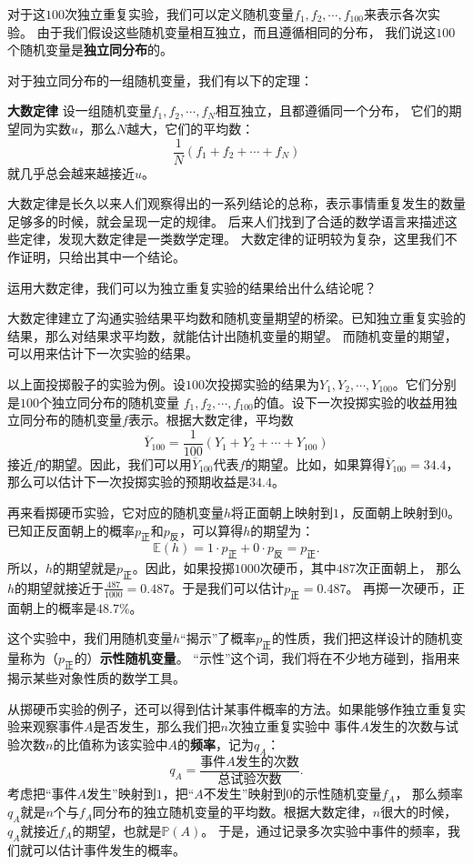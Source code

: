 \documentclass[12pt,UTF8,fontset=none]{ctexbook}
\begin{document}
对于这$100$次独立重复实验，我们可以定义随机变量$f_1,f_2,\cdots , f_{100}$来表示各次实验。
由于我们假设这些随机变量相互独立，而且遵循相同的分布，
我们说这$100$个随机变量是\textbf{独立同分布}的。

对于独立同分布的一组随机变量，我们有以下的定理：
\begin{tm}\textbf{大数定律}
    设一组随机变量$f_1, f_2, \cdots, f_{N}$相互独立，且都遵循同一个分布，
    它们的期望同为实数$u$，那么$N$越大，它们的平均数：
    $$\frac{1}{N}\left(f_1 + f_2 + \cdots + f_{N}\right)$$
    就几乎总会越来越接近$u$。
\end{tm}

大数定律是长久以来人们观察得出的一系列结论的总称，表示事情重复发生的数量足够多的时候，就会呈现一定的规律。
后来人们找到了合适的数学语言来描述这些定律，发现大数定律是一类数学定理。
大数定律的证明较为复杂，这里我们不作证明，只给出其中一个结论。

运用大数定律，我们可以为独立重复实验的结果给出什么结论呢？

大数定律建立了沟通实验结果平均数和随机变量期望的桥梁。已知独立重复实验的结果，那么对结果求平均数，就能估计出随机变量的期望。
而随机变量的期望，可以用来估计下一次实验的结果。

以上面投掷骰子的实验为例。设$100$次投掷实验的结果为$Y_1, Y_2, \cdots , Y_{100}$。它们分别是$100$个独立同分布的随机变量
$f_1, f_2, \cdots, f_{100}$的值。设下一次投掷实验的收益用独立同分布的随机变量$f$表示。根据大数定律，平均数
$$\overline{Y}_{100} = \frac{1}{100}(Y_1 + Y_2 + \cdots + Y_{100})$$
接近$f$的期望。因此，我们可以用$\overline{Y}_{100}$代表$f$的期望。比如，如果算得$\overline{Y}_{100} = 34.4$，
那么可以估计下一次投掷实验的预期收益是$34.4$。

再来看掷硬币实验，它对应的随机变量$h$将正面朝上映射到$1$，反面朝上映射到$0$。
已知正反面朝上的概率$p_{\text{正}}$和$p_{\text{反}}$，可以算得$h$的期望为：
$$ \mathbb{E}(h) = 1 \cdot p_{\text{正}} + 0 \cdot p_{\text{反}} = p_{\text{正}}.$$
所以，$h$的期望就是$p_{\text{正}}$。因此，如果投掷$1000$次硬币，其中$487$次正面朝上，
那么$h$的期望就接近于$\frac{487}{1000} = 0.487$。于是我们可以估计$p_{\text{正}} = 0.487$。
再掷一次硬币，正面朝上的概率是$48.7\%$。

这个实验中，我们用随机变量$h$“揭示”了概率$p_{\text{正}}$的性质，我们把这样设计的随机变量称为（$p_{\text{正}}$的）\textbf{示性随机变量}。
“示性”这个词，我们将在不少地方碰到，指用来揭示某些对象性质的数学工具。

从掷硬币实验的例子，还可以得到估计某事件概率的方法。如果能够作独立重复实验来观察事件$A$是否发生，那么我们把$n$次独立重复实验中
事件$A$发生的次数与试验次数$n$的比值称为该实验中$A$的\textbf{频率}，记为$q_A$：
$$ q_A = \frac{\mbox{事件}A\mbox{发生的次数}}{\mbox{总试验次数}}.$$
考虑把“事件$A$发生”映射到$1$，把“$A$不发生”映射到$0$的示性随机变量$f_A$，
那么频率$q_A$就是$n$个与$f_A$同分布的独立随机变量的平均数。根据大数定律，$n$很大的时候，$q_A$就接近$f_A$的期望，也就是$\mathbb{P}(A)$。
于是，通过记录多次实验中事件的频率，我们就可以估计事件发生的概率。
\end{document}
